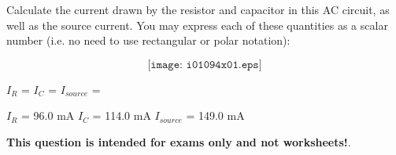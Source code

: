

Calculate the current drawn by the resistor and capacitor in this AC circuit, as well as the source current.  You may express each of these quantities as a scalar number (i.e. no need to use rectangular or polar notation):

$$\texttt{[image: i01094x01.eps]}$$

$I_R$ = \hskip 100pt $I_C$ = \hskip 100pt $I_{source}$ = 

\vskip 10pt







$I_R$ = 96.0 mA \hskip 100pt $I_C$ = 114.0 mA \hskip 100pt $I_{source}$ = 149.0 mA







{\bf This question is intended for exams only and not worksheets!}.



